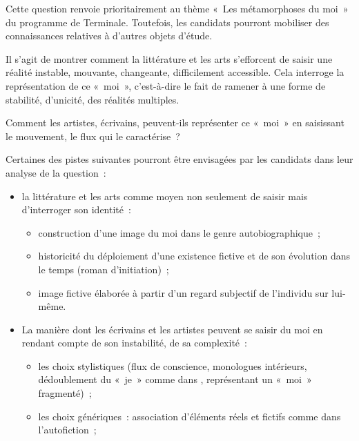 		{Cette question renvoie prioritairement au thème «~Les métamorphoses du moi~» du
programme de Terminale. Toutefois, les candidats pourront mobiliser des
connaissances relatives à d'autres objets d'étude.

Il s'agit de montrer comment la littérature et les arts s'efforcent de saisir une réalité
instable, mouvante, changeante, difficilement accessible. Cela interroge la
représentation de ce «~moi~», c'est-à-dire le fait de ramener à une forme de stabilité,
d'unicité, des réalités multiples.

Comment les artistes, écrivains, peuvent-ils représenter ce «~moi~» en saisissant le
mouvement, le flux qui le caractérise~?

Certaines des pistes suivantes pourront être envisagées par les candidats dans leur
analyse de la question~:

\begin{itemize}[label=$\bullet$]

\item la littérature et les arts comme moyen non seulement de saisir mais d'interroger
son identité~:

\begin{itemize}

\item construction d'une image du moi dans le genre autobiographique~;

\item historicité du déploiement d'une existence fictive et de son évolution dans le temps
(roman d'initiation)~;

\item image fictive élaborée à partir d'un regard subjectif de l'individu sur lui-même.

\end{itemize}

\item La manière dont les écrivains et les artistes peuvent se saisir du moi en rendant
compte de son instabilité, de sa complexité~:

\begin{itemize}

\item les choix stylistiques (flux de conscience, monologues intérieurs, dédoublement du
«~je~» comme dans ,  représentant un «~moi~» fragmenté)~;

\item les choix génériques~: association d'éléments réels et fictifs comme dans
l'autofiction~;


\end{itemize}
\end{itemize}}
